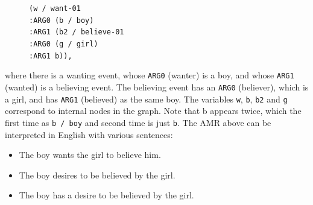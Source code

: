 \documentclass[oneside]{memoir}
\begin{document}
\begin{figure}[h]
    \small{ \texttt{(w / want-01\\
    \hspace*{4 mm}:ARG0 (b / boy)\\
    \hspace*{4 mm}:ARG1 (b2 / believe-01\\  
    \hspace*{8 mm}:ARG0 (g / girl)\\
    \hspace*{8 mm}:ARG1 b)),}}
\end{figure}
where there is a wanting event, whose \texttt{ARG0} (wanter) is a boy, and whose \texttt{ARG1} (wanted) is a believing event. The believing event has an \texttt{ARG0} (believer), which is a girl, and has \texttt{ARG1} (believed) as the same boy. The variables \texttt{w}, \texttt{b}, \texttt{b2} and \texttt{g} correspond to internal nodes in the graph. Note that b appears twice, which the first time as \texttt{b / boy} and second time is just \texttt{b}. The AMR above can be interpreted in English with various sentences:
\begin{itemize}
    \item The boy wants the girl to believe him.
    \item The boy desires to be believed by the girl.
    \item The boy has a desire to be believed by the girl.
\end{itemize}



%
%




%
%
\end{document}
